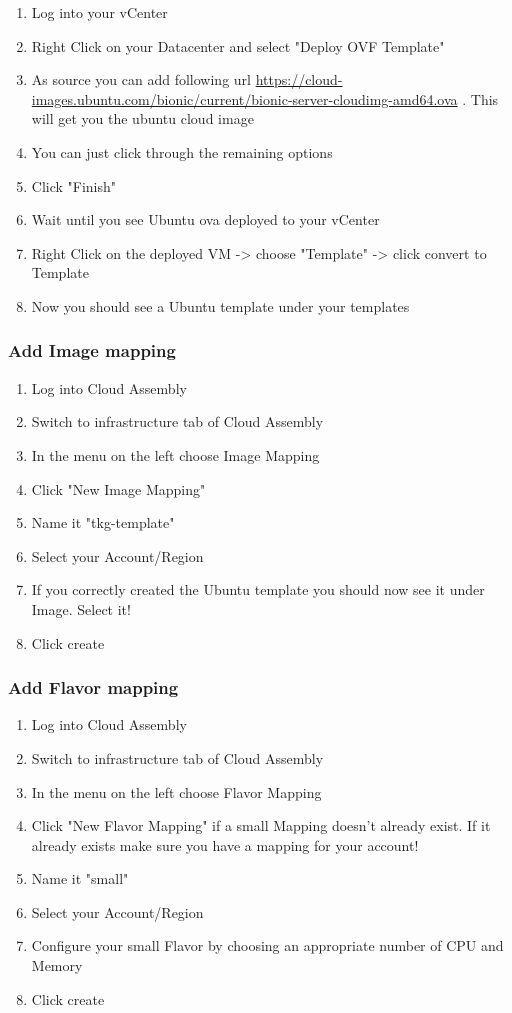 \documentclass{article}
\begin{document}
\begin{enumerate}
  \item Log into your vCenter
  \item Right Click on your Datacenter and select "Deploy OVF Template"
  \item As source you can add following url \url{https://cloud-images.ubuntu.com/bionic/current/bionic-server-cloudimg-amd64.ova} . This will get you the ubuntu cloud image
  \item You can just click through the remaining options
  \item Click "Finish"
  \item Wait until you see Ubuntu ova deployed to your vCenter
  \item Right Click on the deployed VM -> choose "Template" -> click convert to Template
  \item Now you should see a Ubuntu template under your templates
\end{enumerate}


\subsubsection{Add Image mapping}

\begin{enumerate}
  \item Log into Cloud Assembly
  \item Switch to infrastructure tab of Cloud Assembly
  \item In the menu on the left choose Image Mapping
  \item Click "New Image Mapping"
  \item Name it "tkg-template"
  \item Select your Account/Region
  \item If you correctly created the Ubuntu template you should now see it under Image. Select it!
  \item Click create
\end{enumerate}

\subsubsection{Add Flavor mapping}

\begin{enumerate}
  \item Log into Cloud Assembly
  \item Switch to infrastructure tab of Cloud Assembly
  \item In the menu on the left choose Flavor Mapping
  \item Click "New Flavor Mapping" if a small Mapping doesn't already exist. If it already exists make sure you have a mapping for your account!
  \item Name it "small"
  \item Select your Account/Region
  \item Configure your small Flavor by choosing an appropriate number of CPU and Memory
  \item Click create
\end{enumerate}
\end{document}

